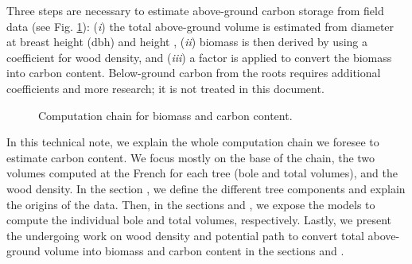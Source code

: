 Three steps are necessary to estimate above-ground carbon storage from field data (see Fig. \ref{fig::scheme}): (\textit{i}) the total above-ground volume is estimated from diameter at breast height (dbh) and height \parencite{Vallet2006}, (\textit{ii}) biomass is then derived by using a coefficient for wood density, and (\textit{iii}) a factor is applied to convert the biomass into carbon content. Below-ground carbon from the roots requires additional coefficients and more research; it is not treated in this document. \\

\begin{figure}[h]
    \centering
	
	\caption{Computation chain for biomass and carbon content.\label{fig::scheme}}
\end{figure}

In this technical note, we explain the whole computation chain we foresee to estimate carbon content. We focus mostly on the base of the chain, \ie the two volumes computed at the French \NFI{} for each tree (bole and total volumes), and the wood density. In the section , we define the different tree components and explain the origins of the data. Then, in the sections  and , we expose the models to compute the individual bole and total volumes, respectively. Lastly, we present the undergoing work on wood density and potential path to convert total above-ground volume into biomass and carbon content in the sections  and .
